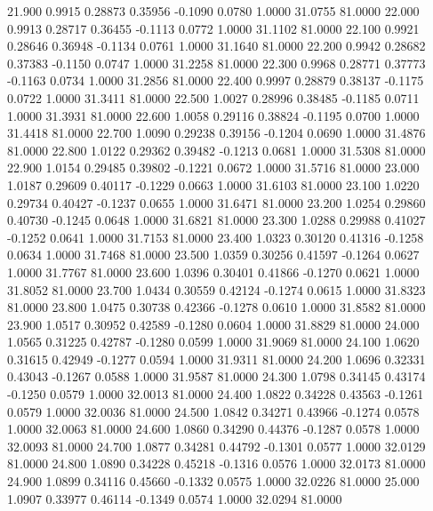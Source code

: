   21.900   0.9915   0.28873   0.35956  -0.1090   0.0780   1.0000  31.0755  81.0000
  22.000   0.9913   0.28717   0.36455  -0.1113   0.0772   1.0000  31.1102  81.0000
  22.100   0.9921   0.28646   0.36948  -0.1134   0.0761   1.0000  31.1640  81.0000
  22.200   0.9942   0.28682   0.37383  -0.1150   0.0747   1.0000  31.2258  81.0000
  22.300   0.9968   0.28771   0.37773  -0.1163   0.0734   1.0000  31.2856  81.0000
  22.400   0.9997   0.28879   0.38137  -0.1175   0.0722   1.0000  31.3411  81.0000
  22.500   1.0027   0.28996   0.38485  -0.1185   0.0711   1.0000  31.3931  81.0000
  22.600   1.0058   0.29116   0.38824  -0.1195   0.0700   1.0000  31.4418  81.0000
  22.700   1.0090   0.29238   0.39156  -0.1204   0.0690   1.0000  31.4876  81.0000
  22.800   1.0122   0.29362   0.39482  -0.1213   0.0681   1.0000  31.5308  81.0000
  22.900   1.0154   0.29485   0.39802  -0.1221   0.0672   1.0000  31.5716  81.0000
  23.000   1.0187   0.29609   0.40117  -0.1229   0.0663   1.0000  31.6103  81.0000
  23.100   1.0220   0.29734   0.40427  -0.1237   0.0655   1.0000  31.6471  81.0000
  23.200   1.0254   0.29860   0.40730  -0.1245   0.0648   1.0000  31.6821  81.0000
  23.300   1.0288   0.29988   0.41027  -0.1252   0.0641   1.0000  31.7153  81.0000
  23.400   1.0323   0.30120   0.41316  -0.1258   0.0634   1.0000  31.7468  81.0000
  23.500   1.0359   0.30256   0.41597  -0.1264   0.0627   1.0000  31.7767  81.0000
  23.600   1.0396   0.30401   0.41866  -0.1270   0.0621   1.0000  31.8052  81.0000
  23.700   1.0434   0.30559   0.42124  -0.1274   0.0615   1.0000  31.8323  81.0000
  23.800   1.0475   0.30738   0.42366  -0.1278   0.0610   1.0000  31.8582  81.0000
  23.900   1.0517   0.30952   0.42589  -0.1280   0.0604   1.0000  31.8829  81.0000
  24.000   1.0565   0.31225   0.42787  -0.1280   0.0599   1.0000  31.9069  81.0000
  24.100   1.0620   0.31615   0.42949  -0.1277   0.0594   1.0000  31.9311  81.0000
  24.200   1.0696   0.32331   0.43043  -0.1267   0.0588   1.0000  31.9587  81.0000
  24.300   1.0798   0.34145   0.43174  -0.1250   0.0579   1.0000  32.0013  81.0000
  24.400   1.0822   0.34228   0.43563  -0.1261   0.0579   1.0000  32.0036  81.0000
  24.500   1.0842   0.34271   0.43966  -0.1274   0.0578   1.0000  32.0063  81.0000
  24.600   1.0860   0.34290   0.44376  -0.1287   0.0578   1.0000  32.0093  81.0000
  24.700   1.0877   0.34281   0.44792  -0.1301   0.0577   1.0000  32.0129  81.0000
  24.800   1.0890   0.34228   0.45218  -0.1316   0.0576   1.0000  32.0173  81.0000
  24.900   1.0899   0.34116   0.45660  -0.1332   0.0575   1.0000  32.0226  81.0000
  25.000   1.0907   0.33977   0.46114  -0.1349   0.0574   1.0000  32.0294  81.0000
